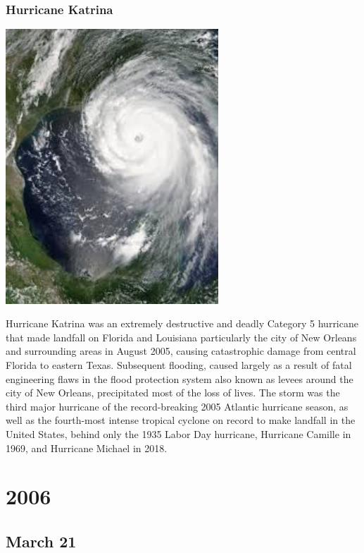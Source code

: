 \documentclass[11pt]{report}
\begin{document}
\subsection{Hurricane Katrina}
\vspace{2mm}\begin{center}\includegraphics[width=8cm]{./img/hurricaneKatrina.jpg}\end{center}
Hurricane Katrina was an extremely destructive and deadly Category 5 hurricane that made landfall on Florida and Louisiana particularly the city of New Orleans and surrounding areas in August 2005, causing catastrophic damage from central Florida to eastern Texas. Subsequent flooding, caused largely as a result of fatal engineering flaws in the flood protection system also known as levees around the city of New Orleans, precipitated most of the loss of lives. The storm was the third major hurricane of the record-breaking 2005 Atlantic hurricane season, as well as the fourth-most intense tropical cyclone on record to make landfall in the United States, behind only the 1935 Labor Day hurricane, Hurricane Camille in 1969, and Hurricane Michael in 2018.

\chapter{2006}
\section{March 21}
\end{document}

